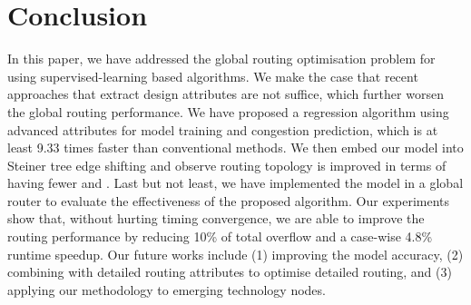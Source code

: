 \section{Conclusion}
\label{sec:conlu}

In this paper, we have addressed the global routing optimisation problem for using supervised-learning based algorithms.
We make the case that recent approaches that extract design attributes are not suffice, which further worsen the global routing performance.
We have proposed a regression algorithm using advanced attributes for model training and congestion prediction, which is at least 9.33 times faster than conventional methods.
We then embed our model into Steiner tree edge shifting and observe routing topology is improved in terms of having fewer  and .
Last but not least, we have implemented the model in a global router to evaluate the effectiveness of the proposed algorithm.
Our experiments show that, without hurting timing convergence, we are able to improve the routing performance by reducing 10\% of total overflow and a case-wise 4.8\% runtime speedup.
Our future works include (1) improving the model accuracy, (2) combining with detailed routing attributes to optimise detailed routing, and (3) applying our methodology to emerging technology nodes.
